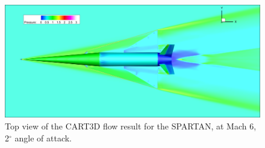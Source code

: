 \begin{figure}[ht]
	\centering
	\includegraphics[width=0.9\linewidth]{figures/3_vehicle_design/CartTop}
	\caption{Top view of the CART3D flow result for the SPARTAN, at Mach 6, 2$^\circ$ angle of attack.}
	\label{fig:CartTop}
\end{figure}


